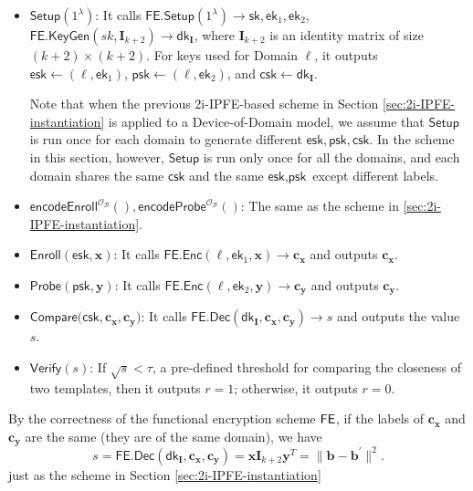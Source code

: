 \begin{itemize}

	\item $\textsf{Setup}(1^\lambda)$: It calls $\textsf{FE.Setup}(1^\lambda) \to \textsf{sk}, \textsf{ek}_1, \textsf{ek}_2$, $\textsf{FE.KeyGen}(sk, \mathbf{I}_{k+2}) \to \textsf{dk}_{\mathbf{I}} $, where $\mathbf{I}_{k+2}$ is an identity matrix of size $(k+2) \times (k+2)$. For keys used for \textsf{Domain} $\ell$, it outputs $\textsf{esk} \gets (\ell, \textsf{ek}_1)$, $\textsf{psk} \gets (\ell, \textsf{ek}_2)$, and $\textsf{csk} \gets \textsf{dk}_{\mathbf{I}}$.

	Note that when the previous 2i-IPFE-based scheme in Section \ref{sec:2i-IPFE-instantiation} is applied to a Device-of-Domain model, we assume that $\textsf{Setup}$ is run once for each domain to generate different $\textsf{esk}, \textsf{psk}, \textsf{csk}$. In the scheme in this section, however, $\textsf{Setup}$ is run only once for all the domains, and each domain shares the same $\textsf{csk}$ and the same $\textsf{esk}, \textsf{psk}$ except different labels.

	\item $\textsf{encodeEnroll}^{\mathcal{O}_{\mathcal{B}}}(), \textsf{encodeProbe}^{\mathcal{O}_{\mathcal{B}}}()$: The same as the scheme in \ref{sec:2i-IPFE-instantiation}. 

	\item $\textsf{Enroll}(\textsf{esk}, \mathbf{x})$: It calls $\textsf{FE.Enc}(\ell, \textsf{ek}_1, \mathbf{x}) \to \mathbf{c_x}$ and outputs $\mathbf{c_x}$.

	\item $\textsf{Probe}(\textsf{psk}, \mathbf{y})$: It calls $\textsf{FE.Enc}(\ell, \textsf{ek}_2, \mathbf{y}) \to \mathbf{c_y}$ and outputs $\mathbf{c_y}$.

	\item $\textsf{Compare}(\textsf{csk}, \mathbf{c_x}, \mathbf{c_y)}$: It calls $\textsf{FE.Dec}(\textsf{dk}_{\mathbf{I}}, \mathbf{c_x}, \mathbf{c_y}) \to s$ and outputs the value $s$.

	\item $\textsf{Verify}(s)$: If $\sqrt{s} < \tau$, a pre-defined threshold for comparing the closeness of two templates, then it outputs $r = 1$; otherwise, it outputs $r = 0$.

\end{itemize}

By the correctness of the functional encryption scheme $\sf FE$, if the labels of $\mathbf{c_x}$ and $\mathbf{c_y}$ are the same (they are of the same domain), we have
\[
	s = \textsf{FE.Dec}(\textsf{dk}_{\mathbf{I}}, \mathbf{c_x}, \mathbf{c_y}) =  \mathbf{x} \mathbf{I}_{k+2} \mathbf{y}^T = \| \mathbf{b} - \mathbf{b}^\prime \|^2.
\]
just as the scheme in Section \ref{sec:2i-IPFE-instantiation}

